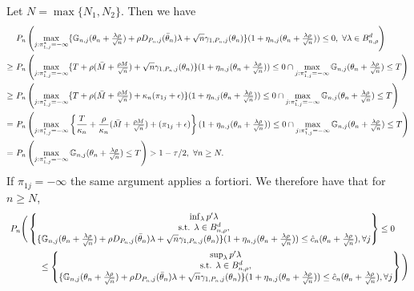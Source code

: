 \documentclass[letterpaper,11pt]{article}
\theoremstyle{myplain}
\theoremstyle{mydefinition}
\theoremstyle{myremark}
\newcommand{\larhon}{\frac{\lambda \rho }{\sqrt n}}
\newcommand{\tlarhon}{\tfrac{\lambda \rho }{\sqrt n}}
\numberwithin{equation}{section}
\numberwithin{figure}{section}
\begin{document}
\begin{appendices}
Let $N=\max\{N_1,N_2\}$. Then we have
\begin{align}
&~P_n \left(\max_{j:\pi^*_{1,j}=-\infty}\{\mathbb G_{n,j}(\theta_n+\tlarhon)+\rho  D_{P_n,j}(\bar\theta_n)\lambda+\sqrt{n} \gamma_{1,P_n,j}(\theta_n)\}(1+\eta_{n,j}(\theta_n+\tlarhon))\le  0 ,~\forall \lambda\in B^d_{n,\rho} \right)\notag\\
\ge &~P_n\left(\max_{j:\pi^*_{1,j}=-\infty} \{T+\rho  (\bar{M} + \tfrac{\rho  M}{\sqrt{n}})+\sqrt{n} \gamma_{1,P_n,j}(\theta_n)\}(1+\eta_{n,j}(\theta_n+\tlarhon))\le  0 \cap \max_{j:\pi^*_{1,j}=-\infty}\mathbb G_{n,j}(\theta_n+\tlarhon) \le T \right)\notag\\
\ge &~P_n\left(\max_{j:\pi^*_{1,j}=-\infty} \{T+\rho  (\bar{M} + \tfrac{\rho  M}{\sqrt{n}})+\kappa_n (\pi_{1j}+\epsilon)\}(1+\eta_{n,j}(\theta_n+\tlarhon))\le  0 \cap \max_{j:\pi^*_{1,j}=-\infty}\mathbb G_{n,j}(\theta_n+\tlarhon) \le T \right)\notag\\
= &~P_n\left(\max_{j:\pi^*_{1,j}=-\infty} \left\{\frac{T}{\kappa_n}+\frac{\rho }{\kappa_n} (\bar{M} + \tfrac{\rho  M}{\sqrt{n}})+(\pi_{1j}+\epsilon)\right\}(1+\eta_{n,j}(\theta_n+\tlarhon))\le  0 \cap \max_{j:\pi^*_{1,j}=-\infty}\mathbb G_{n,j}(\theta_n+\tlarhon) \le T \right)\notag\\
= 	&~P_n \left(\max_{j:\pi^*_{1,j}=-\infty}\mathbb G_{n,j}(\theta_n+\tlarhon) \le T\right)>1-\tau/2,~\forall n\ge N.\notag
\end{align}
If $\pi_{1j}=-\infty$ the same argument applies a fortiori.
We therefore have that for $n\ge N$,
	 \begin{align}
	 &~P_n \Bigg( \begin{Bmatrix} \inf_{\lambda} p^\prime\lambda   \\ \text{s.t. } \lambda\in B^d_{n,\rho},  \\ \{\mathbb G_{n,j}(\theta_n+\larhon)+\rho D_{P_n,j}(\bar\theta_n)\lambda+\sqrt{n} \gamma_{1,P_n,j}(\theta_n)\}(1+\eta_{n,j}(\theta_n+\larhon))\le  \hat{c}_n(\theta_n+\larhon), \forall j    \end{Bmatrix} \leq 0  \notag\\
	&\hspace{0.5in}\leq\begin{Bmatrix} \sup_{\lambda} p'\lambda    \\ \text{s.t. } \lambda\in B^d_{n,\rho}, \\ \{\mathbb G_{n,j}(\theta_n+\larhon)+\rho D_{P_n,j}(\bar\theta_n)\lambda+\sqrt{n} \gamma_{1,P_n,j}(\theta_n)\}(1+\eta_{n,j}(\theta_n+\larhon))\le  \hat{c}_n(\theta_n+\larhon), \forall j    \end{Bmatrix}\Bigg) \label{eq:replace_pi_star1}\\

\end{align}
\end{appendices}
\end{document}
